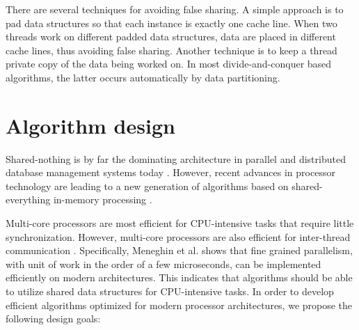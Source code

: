 \documentclass[12pt,a4paper,twoside]{report}
\begin{document}
There are several techniques for avoiding false sharing. A simple
approach is to pad data structures so that each instance is exactly
one cache line. When two threads work on different padded data
structures, data are placed in different cache lines, thus avoiding
false sharing. Another technique is to keep a thread private copy of
the data being worked on. In most divide-and-conquer based algorithms,
the latter occurs automatically by data partitioning.

\section{Algorithm design}
\label{sec:algorithm-design}

Shared-nothing is by far the dominating architecture in parallel and
distributed database management systems today
\cite{pavlo2012skew,zhou2012advanced,vlachou2008efficient,thomson2012calvin}.
However, recent advances in processor technology are leading to a new
generation of algorithms based on shared-everything in-memory
processing \cite{albutiu2012massively,ye2011scalable,krueger2011fast}.


Multi-core processors are most efficient for CPU-intensive tasks that
require little synchronization. However, multi-core processors are
also efficient for inter-thread communication
\cite{meneghin2012performance}. Specifically, Meneghin et al.  shows
that fine grained parallelism, with unit of work in the order of a few
microseconds, can be implemented efficiently on modern architectures.
This indicates that algorithms should be able to utilize shared data
structures for CPU-intensive tasks. In order to develop efficient
algorithms optimized for modern processor architectures, we propose
the following design goals:
\end{document}
